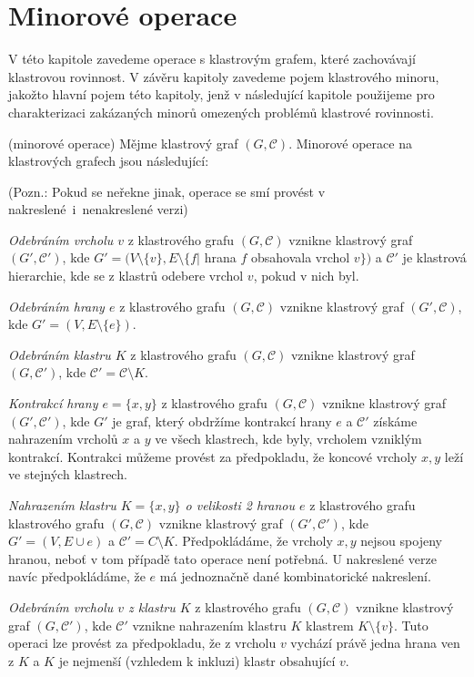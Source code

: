 \chapter{Minorové operace}

V této kapitole zavedeme operace s klastrovým grafem, které zachovávají klastrovou rovinnost. V závěru kapitoly zavedeme pojem klastrového minoru, jakožto hlavní pojem této kapitoly, jenž v následující kapitole použijeme pro charakterizaci zakázaných minorů omezených problémů klastrové rovinnosti.

\begin{defn} (minorové operace) Mějme klastrový graf $(G, \mathcal C)$. Minorové operace na klastrových grafech jsou následující:

(Pozn.: Pokud se neřekne jinak, operace se smí provést v nakreslené~i~nenakreslené verzi)

\textit{Odebráním vrcholu $v$} z klastrového grafu $(G, \mathcal C)$ vznikne klastrový graf  $(G', \mathcal C')$, kde  $G' = (V \setminus \{v\}, E \setminus \{f |$ hrana $f$ obsahovala vrchol $v\})$ a $\mathcal C'$ je klastrová hierarchie, kde se z klastrů odebere vrchol $v$, pokud v nich byl.

\textit{Odebráním hrany $e$} z klastrového grafu $(G, \mathcal C)$ vznikne klastrový graf  $(G', \mathcal C)$, kde $G' =  (V,E \setminus \{e\})$.

\textit{Odebráním klastru $K$} z klastrového grafu $(G, \mathcal C)$ vznikne klastrový graf  $(G, \mathcal C')$, kde $\mathcal C' = \mathcal C \setminus K$.

\textit{Kontrakcí hrany $e=\{x,y\}$} z klastrového grafu $(G, \mathcal C)$ vznikne klastrový graf  $(G', \mathcal C')$, kde $G'$ je graf, který obdržíme kontrakcí hrany $e$ a $\mathcal C'$ získáme nahrazením vrcholů $x$ a $y$ ve všech klastrech, kde byly, vrcholem vzniklým kontrakcí. Kontrakci můžeme provést za předpokladu, že koncové vrcholy $x, y$ leží ve stejných klastrech.

\textit{Nahrazením klastru $K=\{x,y\}$ o velikosti 2 hranou $e$} z klastrového grafu klastrového grafu $(G, \mathcal C)$ vznikne klastrový graf  $(G', \mathcal C')$, kde $G'=(V,E \cup e)$ a $\mathcal C'= C \setminus K$. Předpokládáme, že vrcholy $x, y$ nejsou spojeny hranou, neboť v tom případě tato operace není potřebná. U nakreslené verze navíc předpokládáme, že $e$ má jednoznačně dané kombinatorické nakreslení.

\textit{Odebráním vrcholu $v$ z klastru $K$} z klastrového grafu $(G, \mathcal C)$ vznikne klastrový graf  $(G, \mathcal C')$, kde $\mathcal C'$ vznikne nahrazením klastru $K$ klastrem $K \setminus \{v\}$. Tuto operaci lze provést za předpokladu, že z vrcholu $v$ vychází právě jedna hrana ven z $K$ a $K$ je nejmenší (vzhledem k inkluzi) klastr obsahující $v$.


\end{defn}
